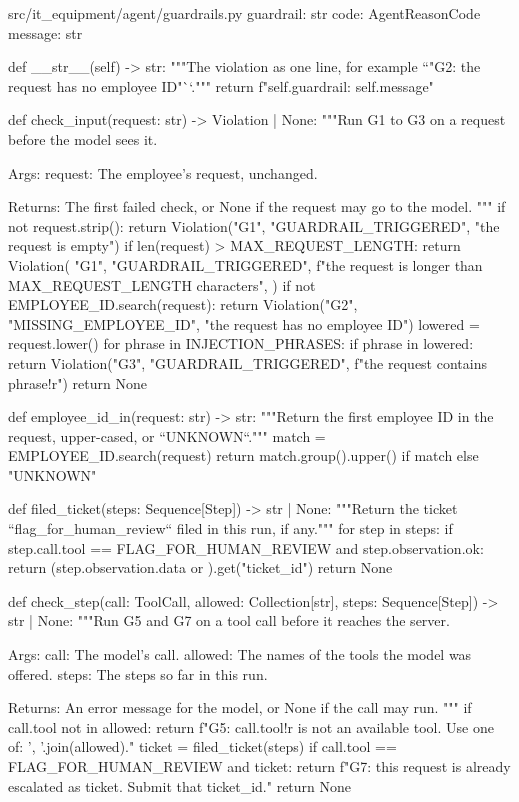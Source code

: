 \documentclass[11pt,letterpaper]{article}
\renewcommand{\_}{\textunderscore\allowbreak}
\begin{document}
\begin{codebox}{src/it_equipment/agent/guardrails.py}
    guardrail: str
    code: AgentReasonCode
    message: str

    def __str__(self) -> str:
        """The violation as one line, for example ``"G2: the request has no employee ID"``."""
        return f"{self.guardrail}: {self.message}"


def check_input(request: str) -> Violation | None:
    """Run G1 to G3 on a request before the model sees it.

    Args:
        request: The employee's request, unchanged.

    Returns:
        The first failed check, or None if the request may go to the model.
    """
    if not request.strip():
        return Violation("G1", "GUARDRAIL_TRIGGERED", "the request is empty")
    if len(request) > MAX_REQUEST_LENGTH:
        return Violation(
            "G1",
            "GUARDRAIL_TRIGGERED",
            f"the request is longer than {MAX_REQUEST_LENGTH} characters",
        )
    if not EMPLOYEE_ID.search(request):
        return Violation("G2", "MISSING_EMPLOYEE_ID", "the request has no employee ID")
    lowered = request.lower()
    for phrase in INJECTION_PHRASES:
        if phrase in lowered:
            return Violation("G3", "GUARDRAIL_TRIGGERED", f"the request contains {phrase!r}")
    return None


def employee_id_in(request: str) -> str:
    """Return the first employee ID in the request, upper-cased, or ``UNKNOWN``."""
    match = EMPLOYEE_ID.search(request)
    return match.group().upper() if match else "UNKNOWN"


def filed_ticket(steps: Sequence[Step]) -> str | None:
    """Return the ticket ``flag_for_human_review`` filed in this run, if any."""
    for step in steps:
        if step.call.tool == FLAG_FOR_HUMAN_REVIEW and step.observation.ok:
            return (step.observation.data or {}).get("ticket_id")
    return None


def check_step(call: ToolCall, allowed: Collection[str], steps: Sequence[Step]) -> str | None:
    """Run G5 and G7 on a tool call before it reaches the server.

    Args:
        call: The model's call.
        allowed: The names of the tools the model was offered.
        steps: The steps so far in this run.

    Returns:
        An error message for the model, or None if the call may run.
    """
    if call.tool not in allowed:
        return f"G5: {call.tool!r} is not an available tool. Use one of: {', '.join(allowed)}."
    ticket = filed_ticket(steps)
    if call.tool == FLAG_FOR_HUMAN_REVIEW and ticket:
        return f"G7: this request is already escalated as {ticket}. Submit that ticket_id."
    return None



\end{codebox}
\end{document}
